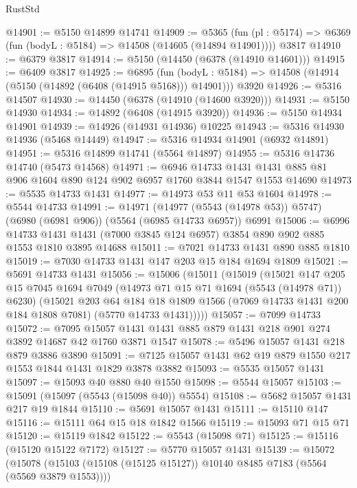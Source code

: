 \begin{lexlean}{RustStd}
\begin{coremodule}
@14901 := @5150 @14899 @14741
@14909 := @5365
    (fun (pl : @5174) => @6369 (fun (bodyL : @5184) => @14508 (@14605 (@14894 @14901))))
    @3817
@14910 := @6379 @3817
@14914 := @5150 (@14450 (@6378 (@14910 @14601)))
@14915 := @6409 @3817
@14925 := @6895
    (fun (bodyL : @5184) => @14508 (@14914 (@5150 (@14892 (@6408 (@14915 @5168))) @14901)))
    @3920
@14926 := @5316 @14507
@14930 := @14450 (@6378 (@14910 (@14600 @3920)))
@14931 := @5150 @14930
@14934 := @14892 (@6408 (@14915 @3920))
@14936 := @5150 @14934 @14901
@14939 := @14926 (@14931 @14936) @10225
@14943 := @5316 @14930 @14936 (@5468 @14449)
@14947 := @5316 @14934 @14901 (@6932 @14891)
@14951 := @5316 @14899 @14741 (@5564 @14897)
@14955 := @5316 @14736 @14740 (@5473 @14568)
@14971 := @6946
    @14733
    @1431
    @1431
    @885
    @81
    @906
    @1604
    @890
    @124
    @902
    @6957
    @1760
    @3844
    @1547
    @1553
    @14690
@14973 := @5535 @14733 @1431
@14977 := @14973 @53 @11 @53 @1604
@14978 := @5544 @14733
@14991 := @14971
    (@14977 (@5543 (@14978 @53)) @5747)
    (@6980 (@6981 @906))
    (@5564 (@6985 @14733 @6957))
    @6991
@15006 := @6996
    @14733
    @1431
    @1431
    (@7000 @3845 @124 @6957)
    @3854
    @890
    @902
    @885
    @1553
    @1810
    @3895
    @14688
@15011 := @7021 @14733 @1431 @890 @885 @1810
@15019 := @7030 @14733 @1431 @147 @203 @15 @184 @1694 @1809
@15021 := @5691 @14733 @1431
@15056 := @15006
    (@15011
      (@15019
        (@15021
          @147
          @205
          @15
          @7045
          @1694
          @7049
          (@14973 @71 @15 @71 @1694 (@5543 (@14978 @71)) @6230)
          (@15021
            @203
            @64
            @184
            @18
            @1809
            @1566
            (@7069 @14733 @1431 @200 @184 @1808 @7081)
            (@5770 @14733 @1431)))))
@15057 := @7099 @14733
@15072 := @7095 @15057 @1431 @1431 @885 @879 @1431 @218 @901 @274 @3892 @14687 @42 @1760 @3871 @1547
@15078 := @5496 @15057 @1431 @218 @879 @3886 @3890
@15091 := @7125 @15057 @1431 @62 @19 @879 @1550 @217 @1553 @1844 @1431 @1829 @3878 @3882
@15093 := @5535 @15057 @1431
@15097 := @15093 @40 @880 @40 @1550
@15098 := @5544 @15057
@15103 := @15091 (@15097 (@5543 (@15098 @40)) @5554)
@15108 := @5682 @15057 @1431 @217 @19 @1844
@15110 := @5691 @15057 @1431
@15111 := @15110 @147
@15116 := @15111 @64 @15 @18 @1842 @1566
@15119 := @15093 @71 @15 @71
@15120 := @15119 @1842
@15122 := @5543 (@15098 @71)
@15125 := @15116 (@15120 @15122 @7172)
@15127 := @5770 @15057 @1431
@15139 := @15072
    (@15078 (@15103 (@15108 (@15125 @15127)) @10140 @8485 @7183 (@5564 (@5569 @3879 @1553))))

\end{coremodule}
\end{lexlean}
